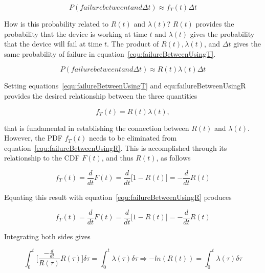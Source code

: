 {\begin{equation}
\label{equ:failureBetweenUsingT}
P(failure between t and \Delta t) \approx f_T(t) \Delta t
\end{equation}

How is this probability related to $R(t)$ and $\lambda(t)$?
$R(t)$ provides the probability that the device is working at time $t$
and $\lambda(t)$ gives the probability that the device will fail
at time $t$. The product of $R(t), \lambda(t)$, and $\Delta t$ gives
the same probability of failure in equation~\ref{equ:failureBetweenUsingT}.

\begin{equation}
\label{equ:failureBetweenUsingR}
P(failure between t and \Delta t) \approx R(t) \lambda(t) \Delta t
\end{equation}

Setting equations~\ref{equ:failureBetweenUsingT} and  {equ:failureBetweenUsingR} 
provides the desired relationship between the three quantities

\begin{equation}
\label{equ:failureBetweenUsingR}
f_T(t) = R(t) \lambda(t) ,
\end{equation}

that is fundamental in establishing the connection between $R(t)$
and $\lambda(t)$. However, the PDF $f_T(t)$ needs to be eliminated 
from equation~\ref{equ:failureBetweenUsingR}. This is accomplished 
through its relationship to the CDF
$F(t)$, and thus $R(t)$, as follows

\begin{equation}
\label{equ:cdfOfF}
f_T(t) = \frac{d}{dt}F(t) = \frac{d}{dt}\big[1-R(t)\big] = -\frac{d}{dt}R(t)
\end{equation}

Equating this result with equation~\ref{equ:failureBetweenUsingR}
produces

\begin{equation}
\label{equ:cdfOfF}
f_T(t) = \frac{d}{dt}F(t) = \frac{d}{dt}\big[1-R(t)\big] = -\frac{d}{dt}R(t)
\end{equation}

Integrating both sides gives

\begin{equation}
\label{equ:bigIntegral}
\int^{t}_0 \big[  \frac{ - \frac{d}{dt}}{R(\tau)} R(\tau) \big] \delta \tau = \int^t_0 \lambda(\tau) \delta \tau \Rightarrow -ln(R(t)) = \int^t_0\lambda(\tau)\delta \tau
\end{equation}

}

